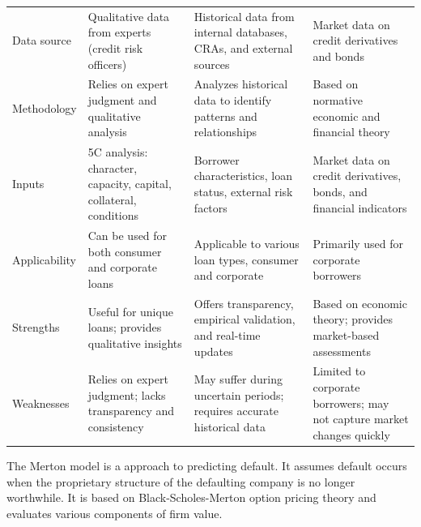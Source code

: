 \begin{center}
\footnotesize
\begin{tabular}{L{2.1cm} L{4.1cm} L{4.1cm} L{4.1cm}}
\toprule
 &  &  &  \\
\midrule
Data source & Qualitative data from experts (credit risk officers) &
  Historical data from internal databases, CRAs, and external sources &
  Market data on credit derivatives and bonds \\
Methodology & Relies on expert judgment and qualitative analysis &
  Analyzes historical data to identify patterns and relationships &
  Based on normative economic and financial theory \\
Inputs & 5C analysis: character, capacity, capital, collateral, conditions &
  Borrower characteristics, loan status, external risk factors &
  Market data on credit derivatives, bonds, and financial indicators \\
Applicability & Can be used for both consumer and corporate loans &
  Applicable to various loan types, consumer and corporate &
  Primarily used for corporate borrowers \\
Strengths & Useful for unique loans; provides qualitative insights &
  Offers transparency, empirical validation, and real-time updates &
  Based on economic theory; provides market-based assessments \\
Weaknesses & Relies on expert judgment; lacks transparency and consistency &
  May suffer during uncertain periods; requires accurate historical data &
  Limited to corporate borrowers; may not capture market changes quickly \\
\bottomrule
\end{tabular}
\end{center}


The Merton model is a  approach to predicting default. It
assumes default occurs when the proprietary structure of the defaulting company is
no longer worthwhile. It is based on Black-Scholes-Merton option pricing theory
and evaluates various components of firm value.

